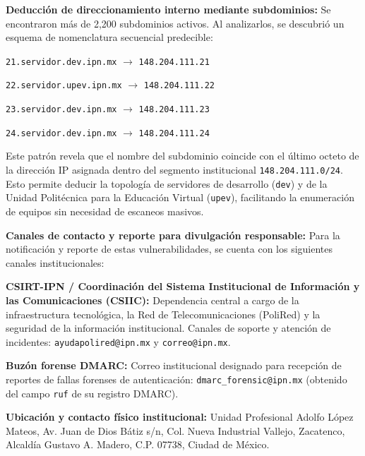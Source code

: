 \begin{itemizeColor}
    \item \textbf{Deducción de direccionamiento interno mediante subdominios:}
    Se encontraron más de 2,200 subdominios activos. Al analizarlos, se descubrió un esquema de nomenclatura secuencial predecible:
    \begin{itemizeColor}
        \item \texttt{21.servidor.dev.ipn.mx} $\rightarrow$ \texttt{148.204.111.21}
        \item \texttt{22.servidor.upev.ipn.mx} $\rightarrow$ \texttt{148.204.111.22}
        \item \texttt{23.servidor.dev.ipn.mx} $\rightarrow$ \texttt{148.204.111.23}
        \item \texttt{24.servidor.dev.ipn.mx} $\rightarrow$ \texttt{148.204.111.24}
    \end{itemizeColor}
    Este patrón revela que el nombre del subdominio coincide con el último octeto de la dirección IP asignada dentro del segmento institucional \texttt{148.204.111.0/24}. Esto permite deducir la topología de servidores de desarrollo (\texttt{dev}) y de la Unidad Politécnica para la Educación Virtual (\texttt{upev}), facilitando la enumeración de equipos sin necesidad de escaneos masivos.

    \item \textbf{Canales de contacto y reporte para divulgación responsable:}
    Para la notificación y reporte de estas vulnerabilidades, se cuenta con los siguientes canales institucionales:
    \begin{itemizeColor}
        \item \textbf{CSIRT-IPN / Coordinación del Sistema Institucional de Información y las Comunicaciones (CSIIC):} Dependencia central a cargo de la infraestructura tecnológica, la Red de Telecomunicaciones (PoliRed) y la seguridad de la información institucional. Canales de soporte y atención de incidentes: \texttt{ayudapolired@ipn.mx} y \texttt{correo@ipn.mx}.
        \item \textbf{Buzón forense DMARC:} Correo institucional designado para recepción de reportes de fallas forenses de autenticación: \texttt{dmarc\_forensic@ipn.mx} (obtenido del campo \texttt{ruf} de su registro DMARC).
        \item \textbf{Ubicación y contacto físico institucional:} Unidad Profesional Adolfo López Mateos, Av. Juan de Dios Bátiz s/n, Col. Nueva Industrial Vallejo, Zacatenco, Alcaldía Gustavo A. Madero, C.P. 07738, Ciudad de México.
    \end{itemizeColor}
\end{itemizeColor}

